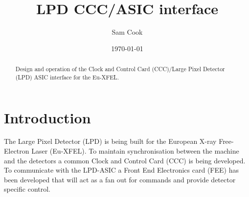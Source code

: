 \documentclass[]{report}
\title{LPD CCC/ASIC interface}
\author{ Sam Cook }
\date{\today}
\begin{document}
    \ifpdf
    \else
    \fi

    \maketitle

    \begin{abstract}
        Design and operation of the Clock and Control Card (CCC)/Large Pixel Detector (LPD) ASIC interface for the Eu-XFEL. 
    \end{abstract}
    \tableofcontents
    \chapter{Introduction} %
    \label{sec:introduction}
    The Large Pixel Detector (LPD) is being built for the European X-ray Free-Electron Laser (Eu-XFEL). To maintain synchronisation between the machine and the detectors a common Clock and Control Card (CCC) is being developed. To communicate with the LPD-ASIC a Front End Electronics card (FEE) has been developed that will act as a fan out for commands and provide detector specific control.
    
\end{document}
